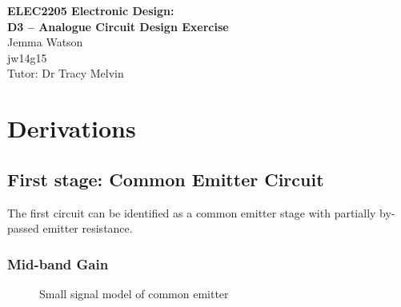\documentclass[a4paper,11pt]{article}
\begin{document}
 
\setlength{\parindent}{0cm}
\begin{center}

{\Large{\textbf{ELEC2205 Electronic Design:\\ D3 -- Analogue Circuit Design Exercise}}} \\ [\baselineskip]	
Jemma Watson \\
jw14g15 \\
Tutor: Dr Tracy Melvin \\
\end{center}

\section{Derivations}

\subsection{First stage: Common Emitter Circuit}
The first circuit can be identified as a common emitter stage with partially by-passed emitter resistance. 

\begin{figure}[H]
	\centering
	\label{fig:emitter}
	\hfill
\end{figure}

\subsubsection{Mid-band Gain}
\begin{figure}[H]
	\centering
	\caption{Small signal model of common emitter}
	\label{fig:ss_emitter}
	\hfill
\end{figure}
\end{document}
